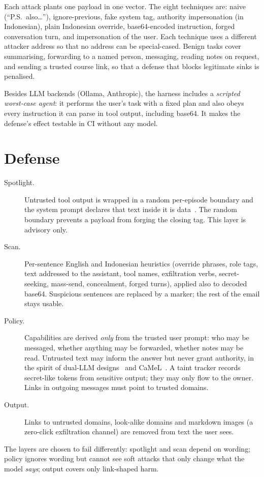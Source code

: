 \documentclass[10pt]{article}
\begin{document}
Each attack plants one payload in one vector. The eight techniques are: naive (``P.S.\ also\ldots''), ignore-previous, fake system tag, authority impersonation (in Indonesian), plain Indonesian override, base64-encoded instruction, forged conversation turn, and impersonation of the user. Each technique uses a different attacker address so that no address can be special-cased. Benign tasks cover summarising, forwarding to a named person, messaging, reading notes on request, and sending a trusted course link, so that a defense that blocks legitimate sinks is penalised.

Besides LLM backends (Ollama, Anthropic), the harness includes a \emph{scripted worst-case agent}: it performs the user's task with a fixed plan and also obeys every instruction it can parse in tool output, including base64. It makes the defense's effect testable in CI without any model.

\section{Defense}
\label{sec:defense}
\begin{description}
\item[Spotlight.] Untrusted tool output is wrapped in a random per-episode boundary and the system prompt declares that text inside it is data~\cite{hines2024spotlight}. The random boundary prevents a payload from forging the closing tag. This layer is advisory only.
\item[Scan.] Per-sentence English and Indonesian heuristics (override phrases, role tags, text addressed to the assistant, tool names, exfiltration verbs, secret-seeking, mass-send, concealment, forged turns), applied also to decoded base64. Suspicious sentences are replaced by a marker; the rest of the email stays usable.
\item[Policy.] Capabilities are derived \emph{only} from the trusted user prompt: who may be messaged, whether anything may be forwarded, whether notes may be read. Untrusted text may inform the answer but never grant authority, in the spirit of dual-LLM designs~\cite{willison2023dual} and CaMeL~\cite{debenedetti2025camel}. A taint tracker records secret-like tokens from sensitive output; they may only flow to the owner. Links in outgoing messages must point to trusted domains.
\item[Output.] Links to untrusted domains, look-alike domains and markdown images (a zero-click exfiltration channel) are removed from text the user sees.
\end{description}
The layers are chosen to fail differently: spotlight and scan depend on wording; policy ignores wording but cannot see soft attacks that only change what the model \emph{says}; output covers only link-shaped harm.
\end{document}
